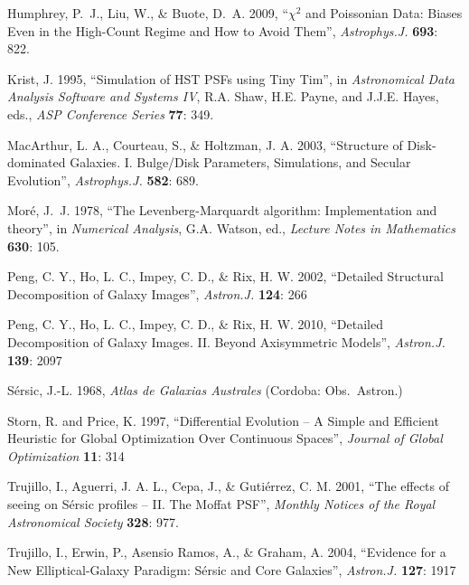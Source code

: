 \documentclass[10pt,a4paper,article]{memoir}
\begin{document}
\begin{thebibliography}{}
 Humphrey, P.~J.,
Liu, W., \& Buote, D.~A. 2009, ``{$\chi$}$^{2}$ and Poissonian Data:
Biases Even in the High-Count Regime and How to Avoid Them'',
\textit{Astrophys.J.} \textbf{693}: 822.

 Krist, J. 1995, ``Simulation of HST PSFs using
Tiny Tim'', in \textit{Astronomical Data Analysis Software and Systems IV}, R.A.
Shaw, H.E. Payne, and J.J.E. Hayes, eds., \textit{ASP Conference Series}
\textbf{77}: 349.

 MacArthur, L. A.,
Courteau, S., \& Holtzman, J. A. 2003, ``Structure of Disk-dominated Galaxies.
I. Bulge/Disk Parameters, Simulations, and Secular Evolution'',
\textit{Astrophys.J.} \textbf{582}: 689.

 Mor{\'e}, J.~J. 1978, ``The
Levenberg-Marquardt algorithm: Implementation and theory'', in
\textit{Numerical Analysis}, G.A. Watson, ed., \textit{Lecture Notes in
Mathematics} \textbf{630}: 105.

 Peng, C. Y., Ho, L. C., Impey, C. D., \&
Rix, H. W. 2002, ``Detailed Structural Decomposition of Galaxy Images'',
\textit{Astron.J.} \textbf{124}: 266

 Peng, C. Y., Ho, L. C., Impey, C. D., \&
Rix, H. W. 2010, ``Detailed Decomposition of Galaxy Images. II. Beyond
Axisymmetric Models'', \textit{Astron.J.} \textbf{139}: 2097

 S{\'e}rsic, J.-L. 1968, \textit{Atlas de 
Galaxias Australes} (Cordoba: Obs.\ Astron.)

 Storn, R. and Price, K. 1997, ``Differential
Evolution -- A Simple and Efficient Heuristic for Global Optimization Over
Continuous Spaces'', \textit{Journal of Global Optimization} \textbf{11}: 314

 Trujillo, I., Aguerri, J. A. L.,
Cepa, J., \& Guti{\'e}rrez, C. M. 2001, ``The effects of seeing on S{\'e}rsic
profiles -- II. The Moffat PSF'', \textit{Monthly Notices of the Royal
Astronomical Society} \textbf{328}: 977.

 Trujillo, I., Erwin, P., Asensio
Ramos, A., \& Graham, A. 2004, ``Evidence for a New Elliptical-Galaxy Paradigm:
S{\'e}rsic and Core Galaxies'', \textit{Astron.J.} \textbf{127}: 1917


\end{thebibliography}
\end{document}
